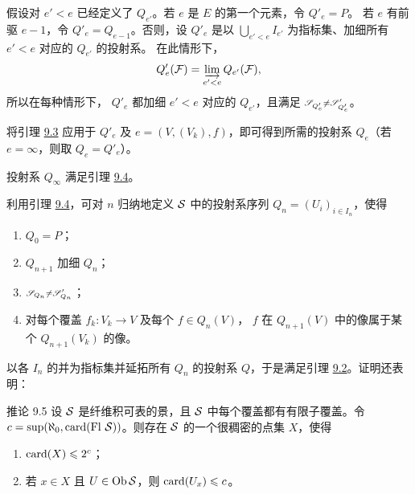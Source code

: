 假设对 $e'<e$ 已经定义了 $Q_{e'}$。若 $e$ 是 $E$ 的第一个元素，令 $Q'_e=P$。
若 $e$ 有前驱 $e-1$，令 $Q'_e=Q_{e-1}$。否则，设 $Q'_e$ 是以
$\bigcup_{e'<e}I_{e'}$ 为指标集、加细所有 $e'<e$ 对应的 $Q_{e'}$ 的投射系。
在此情形下，
$$
Q'_e(\Ff)=\varinjlim_{e'<e}Q_{e'}(\Ff),
$$
所以在每种情形下，\pageoriginale{} $Q'_e$ 都加细 $e'<e$ 对应的 $Q_{e'}$，且满足
$\ss_{Q'_e}\ne\ss'_{Q'_e}$。

将引理 \hyperref[VI.lem9.3]{9.3} 应用于 $Q'_e$ 及 $e=(V,(V_k),f)$，即可得到所需的投射系
$Q_e$（\resp{}若 $e=\infty$，则取 $Q_e=Q'_e$）。

投射系 $Q_{\infty}$ 满足引理 \hyperref[VI.lem9.4]{9.4}。

利用引理 \hyperref[VI.lem9.4]{9.4}，可对 $n$ 归纳地定义 $\Ss$ 中的投射系序列
$Q_n=(U_i)_{i\in I_n}$，使得
\begin{enumerate}
\renewcommand{\theenumi}{\roman{enumi}}
\renewcommand{\labelenumi}{(\theenumi)}
\item $Q_0=P$；

\item $Q_{n+1}$ 加细 $Q_n$；

\item $\ss_{Q_n}\ne\ss'_{Q_n}$；

\item 对每个覆盖 $f_k:V_k\to V$ 及每个 $f\in Q_n(V)$，
$f$ 在 $Q_{n+1}(V)$ 中的像属于某个 $Q_{n+1}(V_k)$ 的像。
\end{enumerate}

以各 $I_n$ 的并为指标集并延拓所有 $Q_n$ 的投射系 $Q$，于是满足引理
\hyperref[VI.lem9.2]{9.2}。证明还表明：

\begin{enonce*}{推论 9.5}
设 $\Ss$ 是纤维积可表的景，且 $\Ss$ 中每个覆盖都有有限子覆盖。令
$c=\sup(\aleph_0,\card(\text{Fl }\Ss))$。则存在 $\Ss$ 的一个很稠密的点集 $X$，使得
\begin{enumerate}
\renewcommand{\theenumi}{\roman{enumi}}
\renewcommand{\labelenumi}{(\theenumi)}
\item $\card(X)\leq2^c$；

\item 若 $x\in X$ 且 $U\in\Ob\Ss$，则 $\card(U_x)\leq c$。
\end{enumerate}
\end{enonce*}

